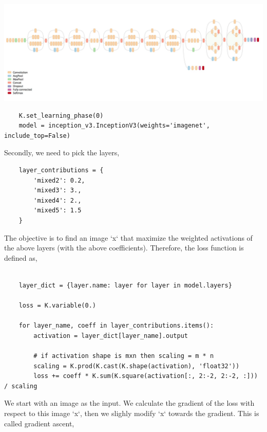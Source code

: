 \documentclass[graybox]{svmult}
\begin{document}
\includegraphics[width=\textwidth]{inceptionv3.png}


\begin{verbatim}
    K.set_learning_phase(0)
    model = inception_v3.InceptionV3(weights='imagenet', include_top=False)
\end{verbatim}

Secondly, we need to pick the layers,

\begin{verbatim}
    layer_contributions = {
        'mixed2': 0.2,
        'mixed3': 3.,
        'mixed4': 2.,
        'mixed5': 1.5
    }
\end{verbatim}

The objective is to find an image `x` that maximize the weighted activations of the above layers (with the above coefficients). Therefore, the loss function is defined as,

\begin{verbatim}
    
    layer_dict = {layer.name: layer for layer in model.layers}
    
    loss = K.variable(0.)
    
    for layer_name, coeff in layer_contributions.items():
        activation = layer_dict[layer_name].output
    
        # if activation shape is mxn then scaling = m * n
        scaling = K.prod(K.cast(K.shape(activation), 'float32'))
        loss += coeff * K.sum(K.square(activation[:, 2:-2, 2:-2, :])) / scaling

\end{verbatim}

We start with an image as the input. We calculate the gradient of the loss with respect to this image `x`, then we slighly modify `x` towards the gradient. This is called gradient ascent,
\end{document}
